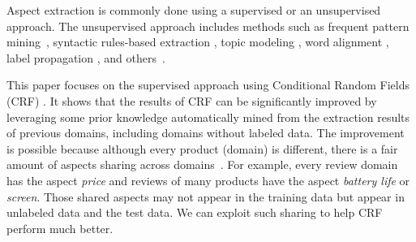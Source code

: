\documentclass[11pt,a4paper]{article}
\theoremstyle{definition}
\begin{document}

Aspect extraction 
is commonly done using a supervised or an unsupervised approach. The unsupervised approach includes methods such as frequent pattern mining~\cite{HuL2004,PopescuNE2005,Zhu2009}, syntactic rules-based extraction \cite{ZhuangJZ2006,WangBo2008,WuZHW2009,Zhang2010,QiuLBC2011,poria2014rule}, topic modeling \cite{MeiLWSZ2007,TitovM2008,LiHuangZhu2010,Brody2010,Wang2010,Moghaddam2011,Mukherjee2012,Lin2009,ZhaoJiang2010,Jo2011,FangHuang2012ACL,WangWWW2016}, word alignment \cite{KangLiu2013IJCAI}, label propagation \cite{Zhou-wan-xiao:2013:EMNLP,shu2016lifelong}, and others~\cite{zhao2015creating}.

This paper focuses on the supervised approach \cite{Jakob2010,Choi2010,Mitchell-EtAl:2013:EMNLP} using Conditional Random Fields (CRF) \cite{Lafferty2001conditional}. It shows that the results of CRF can be significantly improved by leveraging some prior knowledge automatically mined from the extraction results of previous domains, including domains without labeled data. 
The improvement is possible because although every product (domain) is different, there is a fair amount of aspects sharing across domains~\cite{ChenLiu2014ICML}. For example, every review domain has the aspect \textit{price} and reviews of many products have the aspect \textit{battery life} or \textit{screen}. Those shared aspects may not appear in the training data but appear in unlabeled data and the test data.
We can exploit such sharing to help CRF perform much better.



\end{document}
